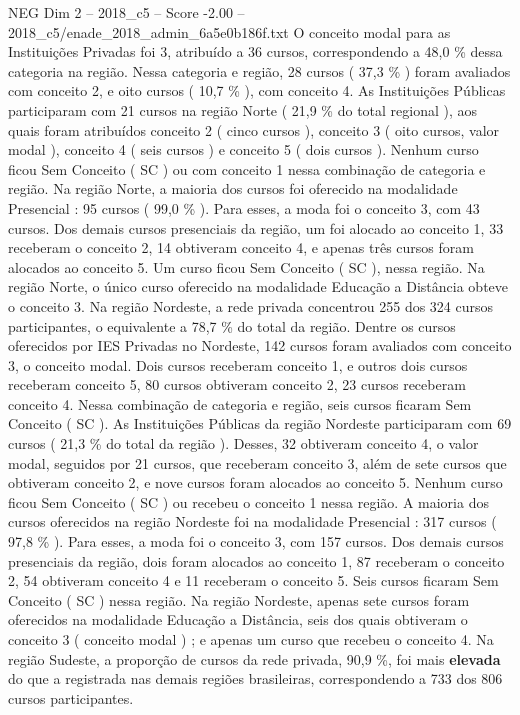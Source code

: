 \begin{textsample}{NEG Dim 2 – 2018\_c5 – Score -2.00 – 2018\_c5/enade\_2018\_admin\_6a5e0b186f.txt}
O conceito modal para as Instituições Privadas foi 3, atribuído a 36 cursos, correspondendo a 48,0 \% dessa categoria na região.
Nessa categoria e região, 28 cursos ( 37,3 \% ) foram avaliados com conceito 2, e oito cursos ( 10,7 \% ), com conceito 4.
As Instituições Públicas participaram com 21 cursos na região Norte ( 21,9 \% do total regional ), aos quais foram atribuídos conceito 2 ( cinco cursos ), conceito 3 ( oito cursos, valor modal ), conceito 4 ( seis cursos ) e conceito 5 ( dois cursos ).
Nenhum curso ficou Sem Conceito ( SC ) ou com conceito 1 nessa combinação de categoria e região.
Na região Norte, a maioria dos cursos foi oferecido na modalidade Presencial : 95 cursos ( 99,0 \% ).
Para esses, a moda foi o conceito 3, com 43 cursos.
Dos demais cursos presenciais da região, um foi alocado ao conceito 1, 33 receberam o conceito 2, 14 obtiveram conceito 4, e apenas três cursos foram alocados ao conceito 5.
Um curso ficou Sem Conceito ( SC ), nessa região.
Na região Norte, o único curso oferecido na modalidade Educação a Distância obteve o conceito 3.
Na região Nordeste, a rede privada concentrou 255 dos 324 cursos participantes, o equivalente a 78,7 \% do total da região.
Dentre os cursos oferecidos por IES Privadas no Nordeste, 142 cursos foram avaliados com conceito 3, o conceito modal.
Dois cursos receberam conceito 1, e outros dois cursos receberam conceito 5, 80 cursos obtiveram conceito 2, 23 cursos receberam conceito 4.
Nessa combinação de categoria e região, seis cursos ficaram Sem Conceito ( SC ).
As Instituições Públicas da região Nordeste participaram com 69 cursos ( 21,3 \% do total da região ).
Desses, 32 obtiveram conceito 4, o valor modal, seguidos por 21 cursos, que receberam conceito 3, além de sete cursos que obtiveram conceito 2, e nove cursos foram alocados ao conceito 5.
Nenhum curso ficou Sem Conceito ( SC ) ou recebeu o conceito 1 nessa região.
A maioria dos cursos oferecidos na região Nordeste foi na modalidade Presencial : 317 cursos ( 97,8 \% ).
Para esses, a moda foi o conceito 3, com 157 cursos.
Dos demais cursos presenciais da região, dois foram alocados ao conceito 1, 87 receberam o conceito 2, 54 obtiveram conceito 4 e 11 receberam o conceito 5.
Seis cursos ficaram Sem Conceito ( SC ) nessa região.
Na região Nordeste, apenas sete cursos foram oferecidos na modalidade Educação a Distância, seis dos quais obtiveram o conceito 3 ( conceito modal ) ; e apenas um curso que recebeu o conceito 4.
Na região Sudeste, a proporção de cursos da rede privada, 90,9 \%, foi mais \textbf{elevada} do que a registrada nas demais regiões brasileiras, correspondendo a 733 dos 806 cursos participantes.

\end{textsample}

